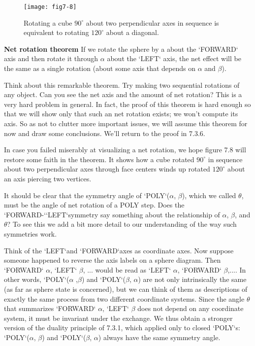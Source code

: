 \documentclass{book}
\begin{document}
\begin{figure}
\begin{center}
\texttt{[image: fig7-8]}
\caption{Rotating a cube $90^{\circ}$ about two perpendicular axes in sequence is equivalent to rotating $120^{\circ}$ about a diagonal.}
\end{center}
\end{figure}

\textbf{Net rotation theorem} If we rotate the sphere by a about the \textsc{`FORWARD`}
axis and then rotate it through $\alpha$ about the \textsc{`LEFT`} axis, the net effect will
be the same as a single rotation (about some axis that depends on $\alpha$ and $\beta$).

Think about this remarkable theorem. Try making two sequential
rotations of any object. Can you see the net axis and the amount of net
rotation? This is a very hard problem in general. In fact, the proof of
this theorem is hard enough so that we will show only that such an net
rotation exists; we won't compute its axis. So as not to clutter more
important issues, we will assume this theorem for now and draw some
conclusions. We'll return to the proof in 7.3.6.

In case you failed miserably at visualizing a net rotation, we hope
figure 7.8 will restore some faith in the theorem. It shows how a cube
rotated $90^{\circ}$ in sequence about two perpendicular axes through face centers winds up rotated $120^{\circ}$ about an axis piercing two vertices.

It should be clear that the symmetry angle of \textsc{`POLY`}($\alpha$, $\beta$), which we
called $\theta$, must be the angle of net rotation of a POLY step. Does the
\textsc{`FORWARD-`}\textsc{`LEFT`}symmetry say something about the relationship of $\alpha$, $\beta$,
and $\theta$? To see this we add a bit more detail to our understanding of the
way such symmetries work.

Think of the \textsc{`LEFT`}and \textsc{`FORWARD`}axes as coordinate axes. Now suppose
someone happened to reverse the axis labels on a sphere diagram. Then
\textsc{`FORWARD`} $\alpha$, \textsc{`LEFT`} $\beta$, ... would be read as \textsc{`LEFT`} $\alpha$, \textsc{`FORWARD`} $\beta$,.... 
In other words, \textsc{`POLY`}($\alpha$ ,$\beta$) and \textsc{`POLY`}($\beta$, $\alpha$) are not only intrinsically the
same (as far as sphere state is concerned), but we can think of them as
descriptions of exactly the same process from two different coordinate
systems. Since the angle $\theta$ that summarizes \textsc{`FORWARD`} $\alpha$, \textsc{`LEFT`} $\beta$ does
not depend on any coordinate system, it must be invariant under the
exchange. We thus obtain a stronger version of the duality principle of
7.3.1, which applied only to closed \textsc{`POLY`}s:
\textsc{`POLY`}($\alpha$, $\beta$) and \textsc{`POLY`}($\beta$, $\alpha$) always have the same symmetry angle.
\end{document}
